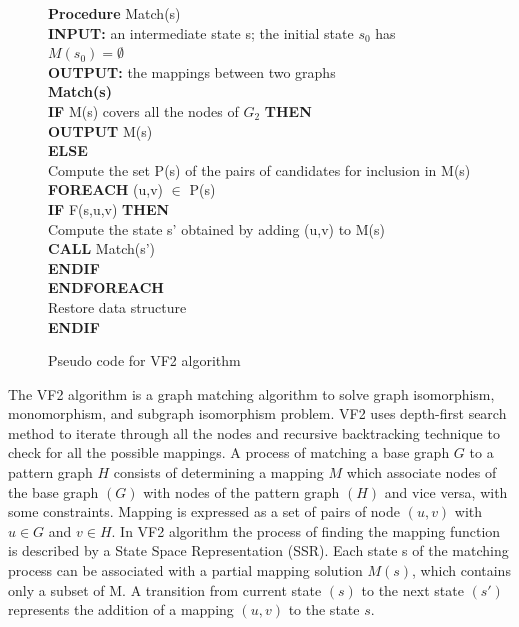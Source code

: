 \begin{figure}

\begin{algorithm}[H]
\begin{algorithmic}
 \LState  \textbf{Procedure} Match(s)\\
\textbf{INPUT:}  an intermediate state s; the initial state $s_0$ has $M(s_0)=\emptyset$\\
\textbf{OUTPUT:} the mappings between two graphs\\
\textbf{Match(s)}\\
 \textbf{IF} M(s) covers all the nodes of $G_2$ \textbf{THEN}\\
\quad \textbf{OUTPUT} M(s)\\
\textbf{ELSE}\\
 \quad    Compute the set P(s) of the pairs of candidates for inclusion in M(s)\\
\quad\textbf{FOREACH} (u,v) $\in$ P(s)\\
\quad\quad\textbf{IF} F(s,u,v) \textbf{THEN}\\
\quad\quad\quad    Compute the state s' obtained by adding (u,v) to M(s)\\
\quad\quad\quad\textbf{CALL} Match(s')\\
\quad\quad\textbf{ENDIF}\\
\quad\textbf{ENDFOREACH}\\
\quad Restore data structure\\
\textbf{ENDIF}\\

\end{algorithmic}
\end{algorithm}
\caption{Pseudo code for VF2 algorithm\cite{cordella2001improved}}
\label{fig:VF2}
\end{figure}


The VF2 algorithm is a graph matching algorithm to solve graph isomorphism, monomorphism, and  subgraph isomorphism problem. VF2 uses depth-first search method to iterate through all the nodes and recursive backtracking technique to check for all the possible mappings. A process of matching 
a base graph $G$ to a pattern graph $H$ consists of determining a mapping $M$ which associate nodes of the base graph $(G)$ with nodes of the pattern graph $(H)$ and vice versa, with some constraints.
Mapping is expressed as a set of pairs of node $(u,v)$ with $u \in G$ and $v \in H$. 
In VF2 algorithm the process of finding the mapping function is described by a  State Space Representation (SSR). Each state s of the matching process can be associated with a partial mapping solution $M(s)$,
which contains only a subset of M. A transition from current state $(s)$ to the next state $(s')$ represents the addition of a mapping $(u,v)$ to the state $s$.

